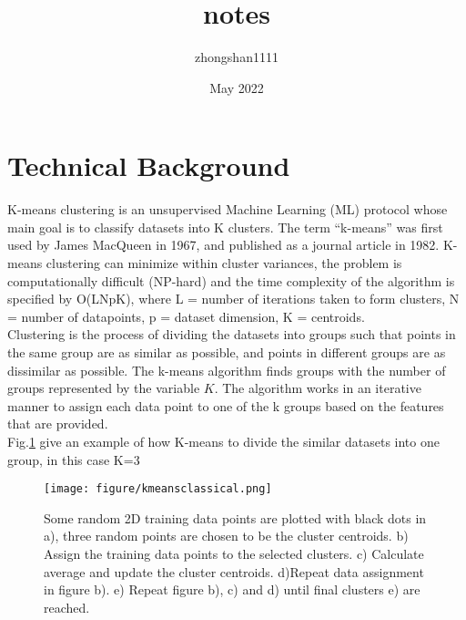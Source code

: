 \documentclass{article}
\title{notes}
\author{zhongshan1111 }
\date{May 2022}
\begin{document}
\section{Technical Background}
K-means clustering is an unsupervised Machine Learning (ML) protocol whose main goal is to classify datasets into K clusters. The term “k-means” was first used by James MacQueen in 1967, and published as a journal article in 1982. K-means clustering can minimize within cluster variances, the problem is computationally difficult (NP-hard) and the time complexity of the algorithm is specified by O(LNpK), where L = number of iterations taken to form clusters, N = number of datapoints, p = dataset dimension, K = centroids.\\

Clustering is the process of dividing the datasets into groups such that points in the same group are as similar as possible, and points in different groups are as dissimilar as possible. The k-means algorithm finds groups with the number of groups represented by the variable $K$. The algorithm works in an iterative manner to assign each data point to one of the k groups based on the features that are provided. \\

Fig.\ref{fig:kmeansclassica} give an example of how K-means to divide the similar datasets into one group, in this case K=3
\begin{figure}[h]
    \centering
    \texttt{[image: figure/kmeansclassical.png]}
    \caption{Some random 2D training data points are plotted with black dots in a), three random points are chosen to be the cluster centroids. b) Assign the training data points to the selected clusters. c) Calculate average and update the cluster centroids. d)Repeat data assignment in figure b). e) Repeat figure b), c) and d) until final clusters e) are reached.}
    \label{fig:kmeansclassica}
\end{figure}
\end{document}
